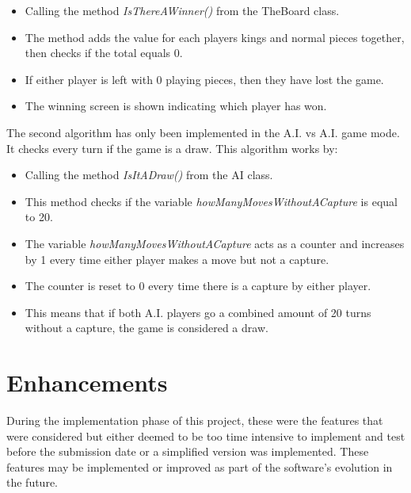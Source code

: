\documentclass[10pt, a4paper]{article}
\begin{document}
    	\begin{itemize}
    	\item Calling the method \textit{IsThereAWinner()} from the TheBoard class.
    	\item The method adds the value for each players kings and normal pieces together, then checks if the total equals 0.
    	\item If either player is left with 0 playing pieces, then they have lost the game.
    	\item The winning screen is shown indicating which player has won.
    	\end{itemize}
    
    	The second algorithm has only been implemented in the A.I. vs A.I. game mode. It checks every turn if the game is a draw.
    	\newline
    	This algorithm works by:
    	
    	\begin{itemize}
    	\item Calling the method \textit{IsItADraw()} from the AI class.
    	\item This method checks if the variable \textit{howManyMovesWithoutACapture} is equal to 20.
    	\item The variable \textit{howManyMovesWithoutACapture} acts as a counter and increases by 1 every time either player makes a move but not a capture.
    	\item The counter is reset to 0 every time there is a capture by either player.
    	\item This means that if both A.I. players go a combined amount of 20 turns without a capture, the game is considered a draw.
    	\end{itemize}
    	
    
    
    
    
    
    
    

    
    
    
\section{Enhancements}
During the implementation phase of this project, these were the features that were considered but either deemed to be too time intensive to implement and test before the submission date or a simplified version was implemented. These features may be implemented or improved as part of the software's evolution in the future.
\end{document}
